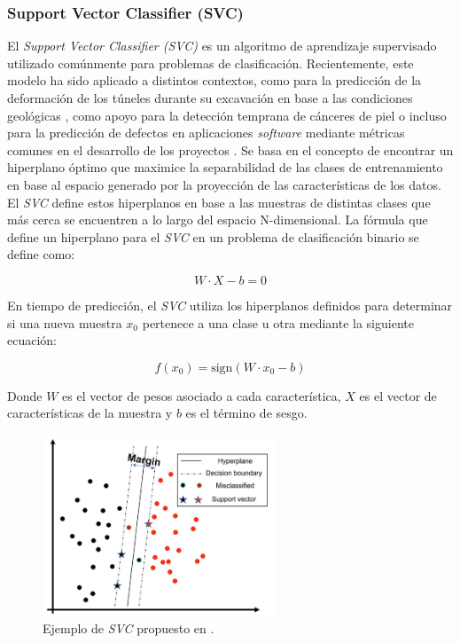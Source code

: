 \documentclass{uathesis-es}
\begin{document}
	\subsubsection*{Support Vector Classifier (SVC)}
	
	
	El \textit{Support Vector Classifier (SVC)} es un algoritmo de aprendizaje supervisado utilizado comúnmente para problemas de clasificación. Recientemente, este modelo ha sido aplicado a distintos contextos, como para la predicción de la deformación de los túneles durante su excavación en base a las condiciones geológicas \cite{zhou2022predicting}, como apoyo para la detección temprana de cánceres de piel \cite{arora2022bag} o incluso para la predicción de defectos en aplicaciones \textit{software} mediante métricas comunes en el desarrollo de los proyectos \cite{goyal2022effective}. Se basa en el concepto de encontrar un hiperplano óptimo que maximice la separabilidad de las clases de entrenamiento en base al espacio generado por la proyección de las características de los datos. El \textit{SVC} define estos hiperplanos en base a las muestras de distintas clases que más cerca se encuentren a lo largo del espacio N-dimensional. La fórmula que define un hiperplano para el \textit{SVC} en un problema de clasificación binario se define como:
	
	\[
	W \cdot X - b = 0
	\]
	
	En tiempo de predicción, el \textit{SVC} utiliza los hiperplanos definidos para determinar si una nueva muestra $x_0$ pertenece a una clase u otra mediante la siguiente ecuación:
	
	\[
	f({x_0}) = \text{sign}({W} \cdot {x_0} - b)
	\]
	
	Donde $W$ es el vector de pesos asociado a cada característica, $X$ es el vector de características de la muestra y $b$ es el término de sesgo.
	
	\begin{figure}[H]
		\centering
		\includegraphics[width=7cm]{Figures/Background/SVC.png}
		\caption{Ejemplo de \textit{SVC} propuesto en \cite{MISRA2020243}.}
		\label{SVC_BACKGROUND}
	\end{figure}
	
\end{document}
